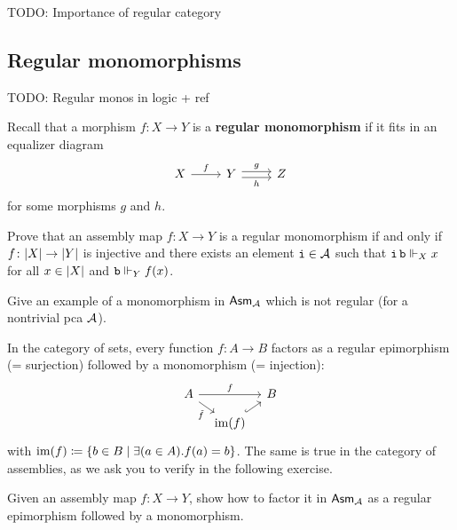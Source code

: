 \textcolor{Mulberry}{TODO: Importance of regular category}

\subsection{Regular monomorphisms}\label{sec:regular-monos}
\textcolor{Mulberry}{TODO: Regular monos in logic + ref}

Recall that a morphism \(f \colon X \to Y\) is a \textbf{regular monomorphism}
if it fits in an equalizer diagram
\[
  \begin{tikzcd}
    X \ar[r,"f"]
    & Y \ar[r,shift left, "g"]\ar[r, shift right, "h"']
    & Z
  \end{tikzcd}
\]
for some morphisms \(g\) and \(h\).

\begin{exercise}%
  \label{exer:characterize-regular-monos}
  Prove that an assembly map \(f \colon X \to Y\) is a regular monomorphism if
  and only if \(f \colon \carrier{X} \to \carrier{Y}\) is injective and there
  exists an element \(\pca{i} \in \AA\) such that
  \(\pca{i}\pca{b} \realizes_X x\) for all \(x \in \carrier{X}\) and
  \(\pca{b} \realizes_Y f(x)\).
\end{exercise}

\begin{exercise}\label{exer:mono-but-not-regular-mono}
  Give an example of a monomorphism in \(\Asm{\AA}\) which is not regular (for a
  nontrivial pca \(\AA\)).
\end{exercise}

In the category of sets, every function \(f \colon A \to B\) factors as a
regular epimorphism (= surjection) followed by a monomorphism (= injection):
\[
  \begin{tikzcd}[row sep=3mm,column sep=3mm]
    A \ar[dr,"\tilde f"'] \ar[rr,"f"] & & B \\
    & \im(f) \ar[ur,hookrightarrow]
  \end{tikzcd}
\]
with \(\im(f) \coloneq \set{b \in B \mid \exists (a \in A).f(a) = b}\).
%
The same is true in the category of assemblies, as we ask you to verify in the
following exercise.

\begin{exercise}\label{exer:reg-epi-mono-factorization}
  Given an assembly map \(f \colon X \to Y\), show how to factor it in
  \(\Asm{\AA}\) as a regular epimorphism followed by a monomorphism.
\end{exercise}

